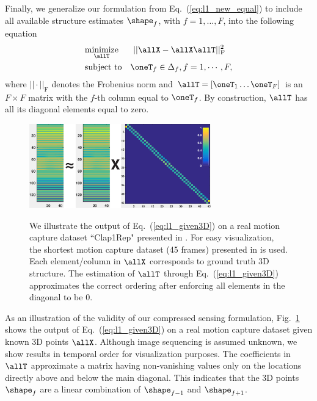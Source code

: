 Finally, we generalize our formulation from Eq.~(\ref{eq:l1_new_equal}) to include all available structure estimates $\shape_f$, with  $f=1,\dotsc,F$, into the following equation
\begin{equation}
\begin{aligned}
& \underset{\allT}{\text{minimize}}&& ~ || \allX - \allX \allT||_\text{F}^2\\
& \text{subject to} && \oneT_f \in \Delta_f, f=1,\cdots,F,
\end{aligned}
\label{eq:l1_given3D}
\end{equation}
where $||\cdot||_\text{F}$ denotes the Frobenius norm and $\allT=[\oneT_1 \dots \oneT_F]$ is an $F\times F$ matrix
with the $f$-th column equal to $\oneT_f$.
By construction, $\allT$ has all its diagonal elements equal to zero.

\begin{figure}
  \centering
  \includegraphics[width=0.7\textwidth]{chapter5/resource/l1.pdf}\\
  \caption{We illustrate the output of Eq.~(\ref{eq:l1_given3D}) on a real motion capture dataset ``Clap1Rep" presented in \cite{cg-2007-2}. 
For easy visualization, the shortest motion capture dataset (45 frames) presented in \cite{cg-2007-2} is used. Each element/column in $\allX$  corresponds to  ground truth 3D structure. The estimation of $\allT$ through Eq.~(\ref{eq:l1_given3D}) approximates the correct ordering after enforcing all elements in the diagonal to be $0$.}
  \label{fig:principle}
\end{figure}

As an illustration of the validity of our compressed sensing formulation, Fig.~\ref{fig:principle} shows the output of Eq.~(\ref{eq:l1_given3D}) on a real motion capture dataset given known 3D points $\allX$. 
Although image sequencing is assumed unknown, we show results in temporal order for visualization purposes.
The coefficients in $\allT$ approximate a matrix having non-vanishing values only on the locations directly above and below the main diagonal.
This indicates that the 3D points $\shape_f$ are a linear combination of $\shape_{f-1}$ and $\shape_{f+1}$. 

